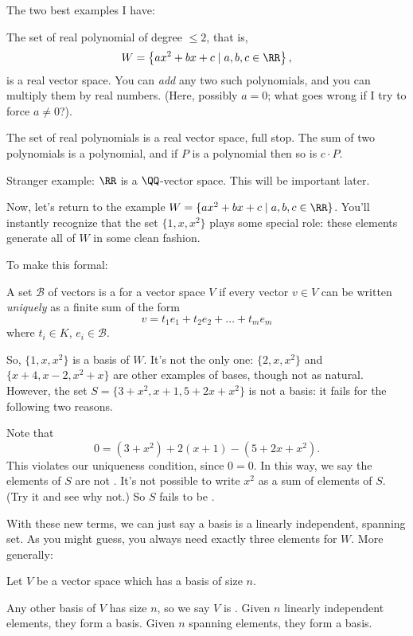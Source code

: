 \documentclass[11pt]{scrartcl}
\begin{document}
The two best examples I have:
\begin{itemize}
  \ii The set of real polynomial of degree $\le 2$, that is,
  \[ W = \left\{ ax^2 + bx + c \mid a,b,c \in \RR \right\}, \]
  is a real vector space.
  You can \emph{add} any two such polynomials,
  and you can multiply them by real numbers.
  (Here, possibly $a=0$; what goes wrong if I try to force $a \neq 0$?).

  \ii The set of real polynomials is a real vector space, full stop.
  The sum of two polynomials is a polynomial, and if $P$ is a polynomial then so is $c \cdot P$.
\end{itemize}
Stranger example: $\RR$ is a $\QQ$-vector space.
This will be important later.

Now, let's return to the example $W = \{ax^2+bx+c \mid a,b,c \in \RR\}$.
You'll instantly recognize that the set $\{1, x, x^2\}$ plays some special role:
these elements generate all of $W$ in some clean fashion.

To make this formal:
\begin{definition}
  A set $\mathcal B$ of vectors is a  for a vector
  space $V$ if every vector $v \in V$ can be written \emph{uniquely}
  as a finite sum of the form
  \begin{equation}
    v = t_1 e_1 + t_2 e_2 + \dots + t_m e_m
    \label{eq:lincomb}
  \end{equation}
  where $t_i \in K$, $e_i \in \mathcal B$.
\end{definition}
So, $\{1, x, x^2\}$ is a basis of $W$.
It's not the only one: $\{2, x, x^2\}$ and $\{x+4, x-2, x^2+x\}$
are other examples of bases, though not as natural.
However, the set $S = \{3+x^2, x+1, 5+2x+x^2\}$ is not a basis:
it fails for the following two reasons.

\begin{itemize}
  \ii Note that
  \[ 0 = (3+x^2) + 2(x+1) - (5+2x+x^2). \]
  This violates our uniqueness condition, since $0 = 0$.
  In this way, we say the elements of $S$
  are not .
  \ii It's not possible to write $x^2$ as a sum of elements of $S$.
  (Try it and see why not.)
  So $S$ fails to be .
\end{itemize}
With these new terms, we can just say a basis is a linearly independent, spanning set.
As you might guess, you always need exactly three elements for $W$.
More generally:
\begin{theorem}
  Let $V$ be a vector space which has a basis of size $n$.
  \begin{enumerate}[(a)]
    \ii Any other basis of $V$ has size $n$,
    so we say $V$ is .
    \ii Given $n$ linearly independent elements, they form a basis.
    \ii Given $n$ spanning elements, they form a basis.
  \end{enumerate}
\end{theorem}
\end{document}
